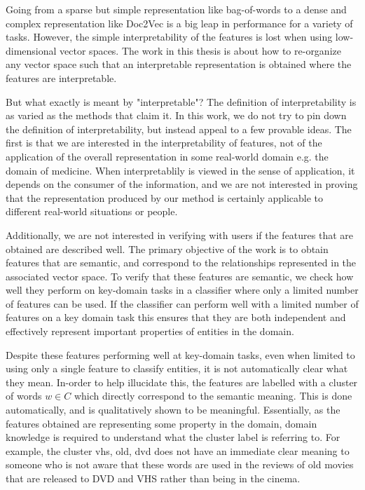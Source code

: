 Going from a sparse but simple representation like bag-of-words to a dense and complex representation like Doc2Vec is a big leap in performance for a variety of tasks. However, the simple interpretability of the features is lost when using low-dimensional vector spaces. The work in this thesis is about how to re-organize any vector space such that an interpretable representation is obtained where the features are interpretable.

But what exactly is meant by "interpretable"? The definition of interpretability is as varied as the methods  that claim it. In this work, we do not try to pin down the definition of interpretability, but instead appeal to a few provable ideas. The first is that we are interested in the interpretability of features, not of the application of the overall representation in some real-world domain e.g. the domain of medicine. When interpretablily is viewed in the sense of application, it depends on the consumer of the information, and we are not interested in proving that the representation produced by our method is certainly applicable to different real-world situations or people.

Additionally, we are not interested in verifying with users if the features that are obtained are  described well. The primary objective of the work is to obtain features that are semantic, and correspond to the relationships represented in the associated vector space. To verify that these features are semantic, we check how well they perform on key-domain tasks in a classifier where only a limited number of features can be used. If the classifier can perform well with a limited number of features on a key domain task this ensures that they are both independent and effectively represent important properties of entities in the domain.

Despite these features performing well at key-domain tasks, even when limited to using only a single feature to classify entities, it is not automatically clear what they mean. In-order to help illucidate this, the features are labelled with a cluster of words $w \in C$ which directly correspond to the semantic meaning. This is done automatically, and is qualitatively shown to be meaningful. Essentially, as the features obtained are representing  some property in the domain, domain knowledge is required to understand what the cluster label is referring to. For example, the cluster {vhs, old, dvd} does not have an immediate clear meaning to someone who is not aware that these words are used in the reviews of old movies that are released to DVD and VHS rather than being in the cinema.

